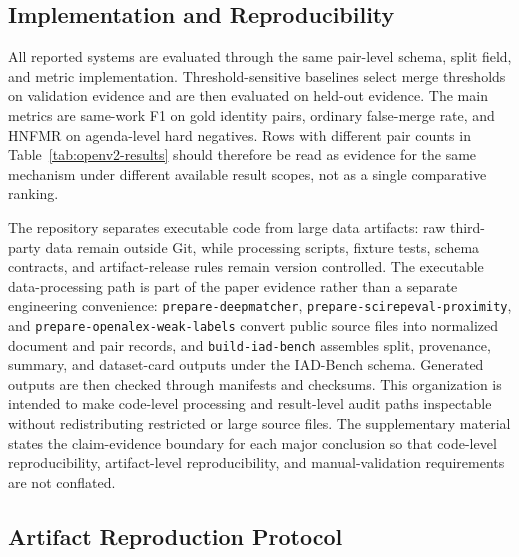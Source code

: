 \documentclass[preprint,12pt]{elsarticle}
\begin{document}
\subsection{Implementation and Reproducibility}

All reported systems are evaluated through the same pair-level schema, split field, and metric implementation. Threshold-sensitive baselines select merge thresholds on validation evidence and are then evaluated on held-out evidence. The main metrics are same-work F1 on gold identity pairs, ordinary false-merge rate, and HNFMR on agenda-level hard negatives. Rows with different pair counts in Table~\ref{tab:openv2-results} should therefore be read as evidence for the same mechanism under different available result scopes, not as a single comparative ranking.

The repository separates executable code from large data artifacts: raw third-party data remain outside Git, while processing scripts, fixture tests, schema contracts, and artifact-release rules remain version controlled. The executable data-processing path is part of the paper evidence rather than a separate engineering convenience: \texttt{prepare-deepmatcher}, \texttt{prepare-scirepeval-proximity}, and \texttt{prepare-openalex-weak-labels} convert public source files into normalized document and pair records, and \texttt{build-iad-bench} assembles split, provenance, summary, and dataset-card outputs under the IAD-Bench schema. Generated outputs are then checked through manifests and checksums. This organization is intended to make code-level processing and result-level audit paths inspectable without redistributing restricted or large source files. The supplementary material states the claim-evidence boundary for each major conclusion so that code-level reproducibility, artifact-level reproducibility, and manual-validation requirements are not conflated.

\subsection{Artifact Reproduction Protocol}
\end{document}
